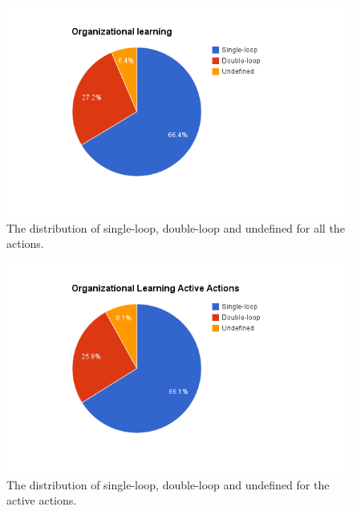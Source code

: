 \begin{table}[!h]
	\begin{center}
	\caption{Results from the content analysis regarding the organizational learning nature of the action.}
	\label{table:organizational-learning-results}
	\end{center}
\end{table}

\begin{figure}[!h]
	\centering
	\includegraphics[width=\textwidth, keepaspectratio]{figures/learning-p.png}
	\caption{The distribution of single-loop, double-loop and undefined for all the actions.}
	\label{figure:learning-p}
\end{figure}

\begin{figure}[!h]
	\centering
	\includegraphics[width=\textwidth, keepaspectratio]{figures/learning-pa.png}
	\caption{The distribution of single-loop, double-loop and undefined for the active actions.}
	\label{figure:learning-pa}
\end{figure}

